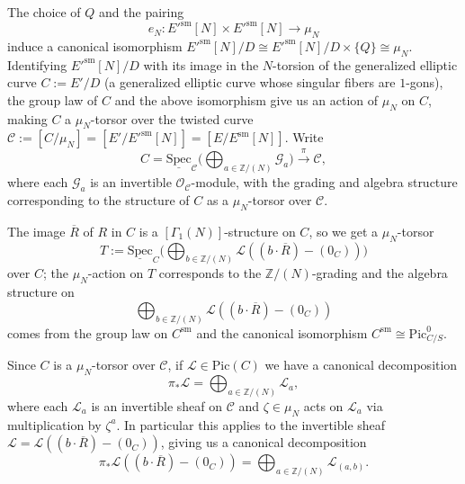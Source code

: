 \documentclass[11pt]{amsart}
\theoremstyle{definition}
\begin{document}
The choice of $Q$ and the pairing 
\begin{displaymath}
e_N: E'^{\mathrm{sm}}[N] \times E'^{\mathrm{sm}}[N] \rightarrow \mu_N
\end{displaymath}
induce a canonical isomorphism $E'^{\mathrm{sm}}[N]/D \cong E'^{\mathrm{sm}}[N]/D \times \{Q\} \cong \mu_N$. Identifying $E'^{\mathrm{sm}}[N]/D$ with its image in the $N$-torsion of the generalized elliptic curve $C := E'/D$ (a generalized elliptic curve whose singular fibers are $1$-gons), the group law of $C$ and the above isomorphism give us an action of $\mu_N$ on $C$, making $C$ a $\mu_N$-torsor over the twisted curve ${\mathcal{C}} := [C/\mu_N] = [E'/E'^{\mathrm{sm}}[N]] = [E/E^{\mathrm{sm}}[N]]$. Write 
\begin{displaymath}
C = \underline{\mathrm{Spec}}_{\mathcal{C}} \big( \bigoplus_{a \in \mathbb{Z}/(N)} {\mathcal{G}}_a \big) \stackrel{\pi}{\longrightarrow} {\mathcal{C}},
\end{displaymath}
where each ${\mathcal{G}}_a$ is an invertible ${\mathcal{O}}_{\mathcal{C}}$-module, with the grading and algebra structure corresponding to the structure of $C$ as a $\mu_N$-torsor over ${\mathcal{C}}$.

The image $\overline{R}$ of $R$ in $C$ is a $[\Gamma_1(N)]$-structure on $C$, so we get a $\mu_N$-torsor 
\begin{displaymath}
T := \underline{\mathrm{Spec}}_C \big( \bigoplus_{b \in \mathbb{Z}/(N)} {\mathcal{L}}((b\cdot \overline{R}) - (0_C)) \big) 
\end{displaymath}
over $C$; the $\mu_N$-action on $T$ corresponds to the $\mathbb{Z}/(N)$-grading and the algebra structure on 
\begin{displaymath}
\bigoplus_{b \in \mathbb{Z}/(N)} {\mathcal{L}}((b\cdot \overline{R})-(0_C)) 
\end{displaymath}
comes from the group law on $C^{\mathrm{sm}}$ and the canonical isomorphism $C^{\mathrm{sm}} \cong \mathrm{Pic}^0_{C/S}$.

Since $C$ is a $\mu_N$-torsor over ${\mathcal{C}}$, if ${\mathcal{L}} \in \mathrm{Pic}(C)$ we have a canonical decomposition 
\begin{displaymath}
\pi_* {\mathcal{L}} = \bigoplus_{a \in \mathbb{Z}/(N) } {\mathcal{L}}_a, 
\end{displaymath}
where each ${\mathcal{L}}_a$ is an invertible sheaf on ${\mathcal{C}}$ and $\zeta \in \mu_N$ acts on ${\mathcal{L}}_a$ via multiplication by $\zeta^a$. In particular this applies to the invertible sheaf ${\mathcal{L}} = {\mathcal{L}}((b\cdot \overline{R}) - (0_C))$, giving us a canonical decomposition 
\begin{displaymath}
\pi_* {\mathcal{L}}((b\cdot \overline{R}) - (0_C)) = \bigoplus_{a \in \mathbb{Z}/(N)} {\mathcal{L}}_{(a,b)}.
\end{displaymath}
\end{document}
